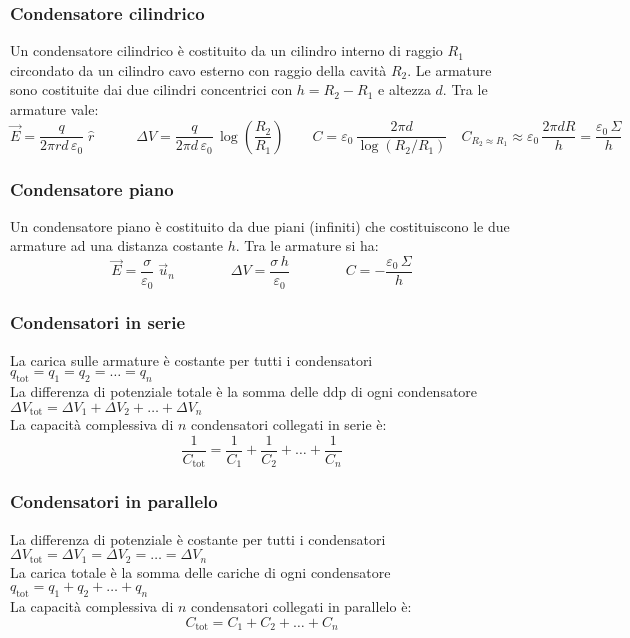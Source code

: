 \documentclass[a4paper]{article}
\newcommand\un{\vec{u}_n}
\begin{document}
\subsubsection*{Condensatore cilindrico}
Un condensatore cilindrico è costituito da un cilindro interno di raggio \(R_1\) circondato da un cilindro cavo esterno con raggio
della cavità \(R_2\). Le armature sono costituite dai due cilindri concentrici con \(h = R_2 - R_1\) e altezza \(d\). Tra le armature vale:
\[\vec{E} = \frac{q}{2 \pi r d \, \varepsilon_0} \; \hat{r} \qquad \quad \Delta V = \frac{q}{2 \pi d \, \varepsilon_0} \, \log \left(\frac{R_2}{R_1}\right) \qquad C = \varepsilon_0 \, \frac{2 \pi d}{\log \left(R_2 / R_1\right)} \quad C_{R_2 \approx R_1} \approx \varepsilon_0 \, \frac{2 \pi d R}{h} = \frac{\varepsilon_0 \, \Sigma}{h}\]

\subsubsection*{Condensatore piano}
Un condensatore piano è costituito da due piani (infiniti) che costituiscono le due armature ad una distanza costante \(h\). Tra le armature si ha:
\[\vec{E} = \frac{\sigma}{\varepsilon_0} \; \un \qquad \qquad \Delta V = \frac{\sigma \, h}{\varepsilon_0} \qquad \qquad C = - \frac{\varepsilon_0 \, \Sigma}{h}\]

\subsubsection*{Condensatori in serie}
La carica sulle armature è costante per tutti i condensatori \(q_\text{tot} = q_1 = q_2 = \dots = q_n\) \\
La differenza di potenziale totale è la somma delle ddp di ogni condensatore \(\Delta V_\text{tot} = \Delta V_1 + \Delta V_2 + \dots + \Delta V_n\) \\
La capacità complessiva di \(n\) condensatori collegati in serie è:
\[\frac{1}{C_\text{tot}} = \frac{1}{C_1} + \frac{1}{C_2} + \dots + \frac{1}{C_n}\]

\subsubsection*{Condensatori in parallelo}
La differenza di potenziale è costante per tutti i condensatori \(\Delta V_\text{tot} = \Delta V_1 = \Delta V_2 = \dots = \Delta V_n\) \\
La carica totale è la somma delle cariche di ogni condensatore \(q_\text{tot} = q_1 + q_2 + \dots + q_n\) \\
La capacità complessiva di \(n\) condensatori collegati in parallelo è:
\[C_\text{tot} = C_1 + C_2 + \dots + C_n\]
\end{document}
